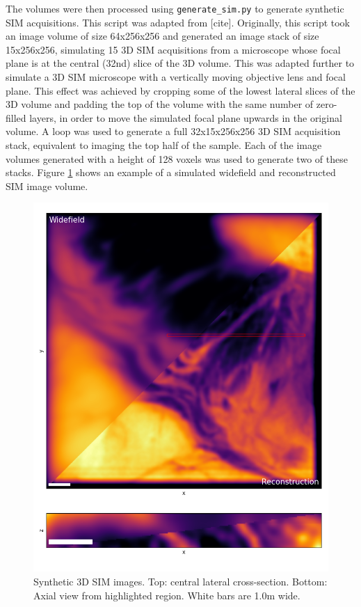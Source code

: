 \documentclass[12pt]{article}
\begin{document}
The volumes were then processed using \texttt{generate\_sim.py} to generate synthetic SIM acquisitions.
This script was adapted from [cite].
Originally, this script took an image volume of size 64x256x256 and generated an image stack of size 15x256x256,
simulating 15 3D SIM acquisitions from a microscope whose focal plane is at the central (32nd) slice of the 3D volume.
This was adapted further to simulate a 3D SIM microscope with a vertically moving objective lens and focal plane.
This effect was achieved by cropping some of the lowest lateral slices of the 3D volume and padding the top of the volume with the same number of zero-filled layers,
in order to move the simulated focal plane upwards in the original volume.
A loop was used to generate a full 32x15x256x256 3D SIM acquisition stack,
equivalent to imaging the top half of the sample.
Each of the image volumes generated with a height of 128 voxels was used to generate two of these stacks.
Figure \ref{fig:3D_SIM} shows an example of a simulated widefield and reconstructed SIM image volume.

\begin{figure}[hbtp]
    \includegraphics[scale=0.8, center]{figures/3DSIM_recon.png}
    \caption{Synthetic 3D SIM images. Top: central lateral cross-section. Bottom: Axial view from highlighted region. White bars are 1.0\textmu m wide.}
    \label{fig:3D_SIM}
\end{figure}
\end{document}
